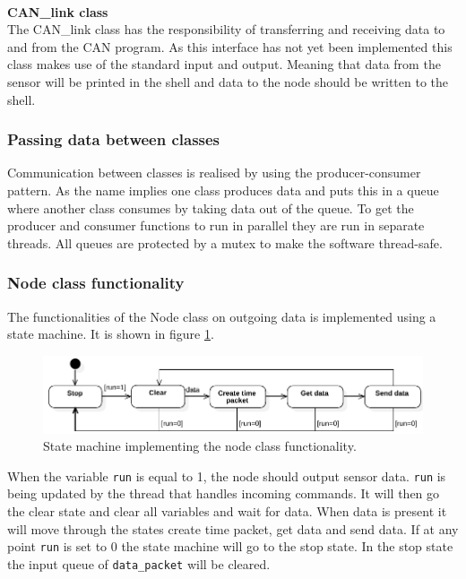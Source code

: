 ~\\ \par \textbf{CAN\_link class} ~ \\
The CAN\_link class has the responsibility of transferring and receiving data to and from the CAN program.
As this interface has not yet been implemented this class makes use of the standard input and output. 
Meaning that data from the sensor will be printed in the shell and data to the node should be written to the shell. 

\subsubsection*{Passing data between classes}
Communication between classes is realised by using the producer-consumer pattern.
As the name implies one class produces data and puts this in a queue where another class consumes by taking data out of the queue.
To get the producer and consumer functions to run in parallel they are run in separate threads.
All queues are protected by a mutex to make the software thread-safe.

\subsubsection*{Node class functionality}
The functionalities of the Node class on outgoing data is implemented using a state machine.
It is shown in figure \ref{fig:state_machine}.
\begin{figure}[!h]
\centering
\includegraphics[width=1\textwidth]{graphics/StateDiagram_Node.pdf}
\caption{State machine implementing the node class functionality. }
\label{fig:state_machine}
\end{figure}
When the variable \texttt{run} is equal to 1, the node should output sensor data.
\texttt{run} is being updated by the thread that handles incoming commands.
It will then go the clear state and clear all variables and wait for data. 
When data is present it will move through the states create time packet, get data and send data. 
If at any point \texttt{run} is set to 0 the state machine will go to the stop state.
In the stop state the input queue of \texttt{data\_packet} will be cleared.












